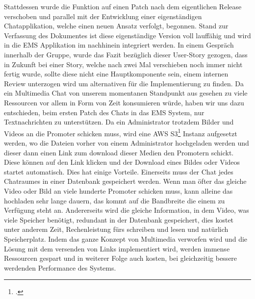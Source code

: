 Stattdessen wurde die Funktion auf einen Patch nach dem eigentlichen Release verschoben und parallel mit der Entwicklung einer eigenständigen Chatapplikation, welche einen neuen Ansatz verfolgt, begonnen. Stand zur Verfassung des Dokumentes ist diese eigenständige Version
voll lauffähig und wird in die EMS Applikation im nachhinein integriert werden. In einem Gespräch innerhalb der Gruppe, wurde das Fazit bezüglich dieser User-Story gezogen, dass in Zukunft bei einer Story, welche nach zwei Mal verschieben noch immer nicht
fertig wurde, sollte diese nicht eine Hauptkomponente sein, einem internen Review unterzogen wird um alternativen für die Implementierung zu finden. Da ein Multimedia Chat von unserem momentanen Standpunkt aus gesehen zu viele
Ressourcen vor allem in Form von Zeit konsumieren würde, haben wir uns dazu entschieden, beim ersten Patch des Chats in das EMS System, nur Textnachrichten zu unterstützen. Da ein Administrator trotzdem Bilder und Videos an die
Promoter schicken muss, wird eine AWS S3\footcite{aws-s3} Instanz aufgesetzt werden, wo die Dateien vorher von einem Administrator hochgeladen werden und dieser dann einen Link zum download dieser Medien den Promotern schickt. Diese können auf
den Link klicken und der Download eines Bildes oder Videos startet automatisch. Dies hat einige Vorteile. Einerseits muss der Chat jedes Chatraumes in einer Datenbank gespeichert werden. Wenn man öfter das gleiche Video oder Bild
an viele hunderte Promoter schicken muss, kann alleine das hochladen sehr lange dauern, das kommt auf die Bandbreite die einem zu Verfügung steht an. Andererseits wird die gleiche Information, in dem Video, was viele Speicher benötigt,
redundant in der Datenbank gespeichert, dies kostet unter anderem Zeit, Rechenleistung fürs schreiben und lesen und natürlich Speicherplatz. Indem das ganze Konzept von Multimedia verworfen wird und die Lösung mit dem versenden von
Links implementiert wird, werden immense Ressourcen gespart und in weiterer Folge auch kosten, bei gleichzeitig bessere werdenden Performance des Systems.


